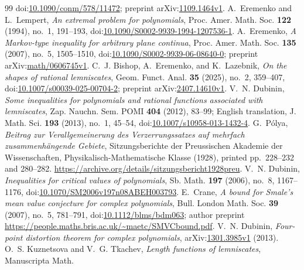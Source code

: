 \documentclass[11pt]{article}
\begin{document}
\begin{thebibliography}{99}
  doi:\href{https://doi.org/10.1090/conm/578/11472}{10.1090/conm/578/11472};
  preprint arXiv:\href{https://arxiv.org/abs/1109.1464v1}{1109.1464v1}.
 A.~Eremenko and L.~Lempert,
  \emph{An extremal problem for polynomials}, Proc. Amer. Math. Soc.
  \textbf{122} (1994), no.~1, 191--193,
  doi:\href{https://doi.org/10.1090/S0002-9939-1994-1207536-1}
  {10.1090/S0002-9939-1994-1207536-1}.
 A.~Eremenko,
  \emph{A Markov-type inequality for arbitrary plane continua},
  Proc. Amer. Math. Soc. \textbf{135} (2007), no.~5, 1505--1510,
  doi:\href{https://doi.org/10.1090/S0002-9939-06-08640-0}
  {10.1090/S0002-9939-06-08640-0};
  preprint arXiv:\href{https://arxiv.org/abs/math/0606745v1}{math/0606745v1}.
 C.~J. Bishop, A.~Eremenko, and
  K.~Lazebnik, \emph{On the shapes of rational lemniscates}, Geom. Funct.
  Anal. \textbf{35} (2025), no.~2, 359--407,
  doi:\href{https://doi.org/10.1007/s00039-025-00704-2}
  {10.1007/s00039-025-00704-2};
  preprint arXiv:\href{https://arxiv.org/abs/2407.14610v1}{2407.14610v1}.
 V.~N. Dubinin, \emph{Some inequalities for polynomials and
  rational functions associated with lemniscates}, Zap. Nauchn. Sem. POMI
  \textbf{404} (2012), 83--99; English translation, J. Math. Sci. \textbf{193}
  (2013), no.~1, 45--54,
  doi:\href{https://doi.org/10.1007/s10958-013-1432-4}{10.1007/s10958-013-1432-4}.
 G.~P\'olya,
  \emph{Beitrag zur Verallgemeinerung des Verzerrungssatzes auf mehrfach
  zusammenh\"angende Gebiete}, Sitzungsberichte der Preussischen Akademie der
  Wissenschaften, Physikalisch-Mathematische Klasse (1928), printed
  pp.~228--232 and 280--282.
  \url{https://archive.org/details/sitzungsbericht1928preu}.
 V.~N. Dubinin,
  \emph{Inequalities for critical values of polynomials}, Sb. Math.
  \textbf{197} (2006), no.~8, 1167--1176,
  doi:\href{https://doi.org/10.1070/SM2006v197n08ABEH003793}{10.1070/SM2006v197n08ABEH003793}.
 E.~Crane,
  \emph{A bound for Smale's mean value conjecture for complex polynomials},
  Bull. London Math. Soc. \textbf{39} (2007), no.~5, 781--791,
  doi:\href{https://doi.org/10.1112/blms/bdm063}{10.1112/blms/bdm063};
  author preprint \url{https://people.maths.bris.ac.uk/~maetc/SMVCbound.pdf}.
 V.~N. Dubinin,
  \emph{Four-point distortion theorem for complex polynomials},
  arXiv:\href{https://arxiv.org/abs/1301.3985v1}{1301.3985v1} (2013).
 O.~S. Kuznetsova and V.~G. Tkachev,
  \emph{Length functions of lemniscates}, Manuscripta Math.

\end{thebibliography}
\end{document}
